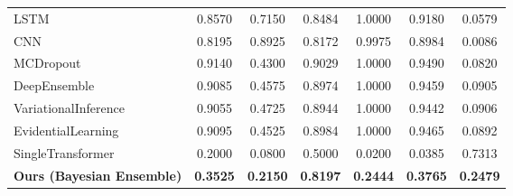 \begin{table}[htbp]
\begin{tabular}{l|ccccc|c}
LSTM & 0.8570 & 0.7150 & 0.8484 & 1.0000 & 0.9180 & 0.0579 \\
CNN & 0.8195 & 0.8925 & 0.8172 & 0.9975 & 0.8984 & 0.0086 \\
MCDropout & 0.9140 & 0.4300 & 0.9029 & 1.0000 & 0.9490 & 0.0820 \\
DeepEnsemble & 0.9085 & 0.4575 & 0.8974 & 1.0000 & 0.9459 & 0.0905 \\
VariationalInference & 0.9055 & 0.4725 & 0.8944 & 1.0000 & 0.9442 & 0.0906 \\
EvidentialLearning & 0.9095 & 0.4525 & 0.8984 & 1.0000 & 0.9465 & 0.0892 \\
SingleTransformer & 0.2000 & 0.0800 & 0.5000 & 0.0200 & 0.0385 & 0.7313 \\
\textbf{Ours (Bayesian Ensemble)} & \textbf{0.3525} & \textbf{0.2150} & \textbf{0.8197} & \textbf{0.2444} & \textbf{0.3765} & \textbf{0.2479} \\
\hline
\end{tabular}
\end{table}